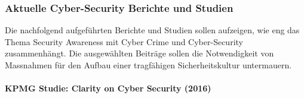 \documentclass[../../main.tex]{subfiles}
\begin{document}
\subsubsection{Aktuelle Cyber-Security Berichte und Studien}

\begin{sloppypar}
Die nachfolgend aufgeführten Berichte und Studien sollen aufzeigen, wie eng das Thema Security Awareness mit Cyber Crime und Cyber-Security zusammenhängt. Die ausgewählten Beiträge sollen die Notwendigkeit von Massnahmen für den Aufbau einer tragfähigen Sicherheitskultur untermauern.
\end{sloppypar}

\paragraph*{KPMG Studie: Clarity on Cyber Security (2016)}\mbox{}
\end{document}
